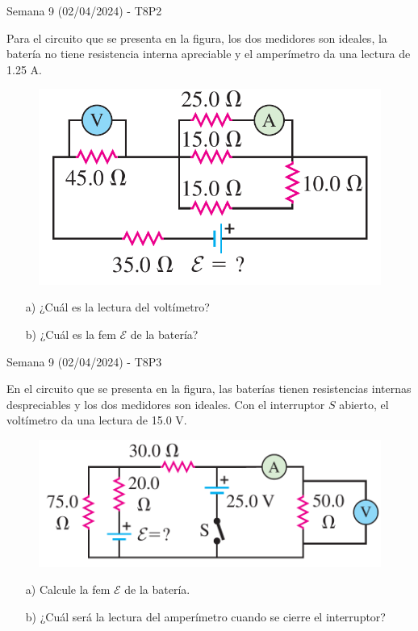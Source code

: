 \begin{frame}{Semana 9 (02/04/2024) - T8P2}

Para el circuito que se presenta en la figura, los dos medidores son ideales, la batería no tiene resistencia interna apreciable y el
amperímetro da una lectura de 1.25 A.

\begin{figure}
    \centering
    \includegraphics[scale=0.2]{figures/t8p2.png}
\end{figure}

\begin{itemize}
    \item[a)] ¿Cuál es la lectura del voltímetro?
    \item[b)] ¿Cuál es la fem $\mathcal{E}$ de la batería?
    
\end{itemize}
    
\end{frame}

\begin{frame}{Semana 9 (02/04/2024) - T8P3}
    
    En el circuito que se presenta en la figura, las baterías tienen resistencias internas despreciables y los dos medidores son ideales. Con el interruptor $S$ abierto, el voltímetro da una lectura de 15.0 V.
    
    \begin{figure}
    \centering
    \includegraphics[scale=0.2]{figures/t8p3.png}
    \end{figure}
    
    \begin{itemize}
        \item[a)] Calcule la fem $\mathcal{E}$ de la batería.
        \item[b)] ¿Cuál será la lectura del amperímetro cuando se cierre el interruptor?
    \end{itemize}
    
\end{frame}

